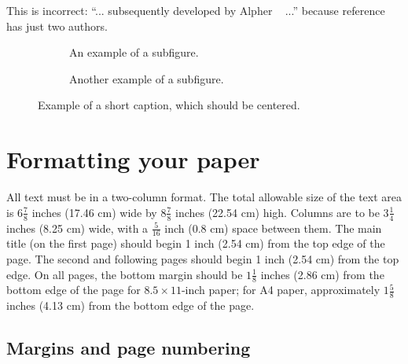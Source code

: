 \documentclass[10pt,twocolumn,letterpaper]{article}
\begin{document}
    This is incorrect: ``... subsequently developed by Alpher \etal~\cite{Alpher03} ...'' because reference~\cite{Alpher03} has just two authors.




    \begin{figure*}
        \centering
        \begin{subfigure}{0.68\linewidth}
            \fbox{\rule{0pt}{2in} \rule{.9\linewidth}{0pt}}
            \caption{An example of a subfigure.}
            \label{fig:short-a}
        \end{subfigure}
        \hfill
        \begin{subfigure}{0.28\linewidth}
            \fbox{\rule{0pt}{2in} \rule{.9\linewidth}{0pt}}
            \caption{Another example of a subfigure.}
            \label{fig:short-b}
        \end{subfigure}
        \caption{Example of a short caption, which should be centered.}
        \label{fig:short}
    \end{figure*}



    \section{Formatting your paper}
    \label{sec:formatting}

    All text must be in a two-column format.
    The total allowable size of the text area is $6\frac78$ inches (17.46 cm) wide by $8\frac78$ inches (22.54 cm) high.
    Columns are to be $3\frac14$ inches (8.25 cm) wide, with a $\frac{5}{16}$ inch (0.8 cm) space between them.
    The main title (on the first page) should begin 1 inch (2.54 cm) from the top edge of the page.
    The second and following pages should begin 1 inch (2.54 cm) from the top edge.
    On all pages, the bottom margin should be $1\frac{1}{8}$ inches (2.86 cm) from the bottom edge of the page for $8.5 \times 11$-inch paper;
    for A4 paper, approximately $1\frac{5}{8}$ inches (4.13 cm) from the bottom edge of the
    page.


    \subsection{Margins and page numbering}
\end{document}
